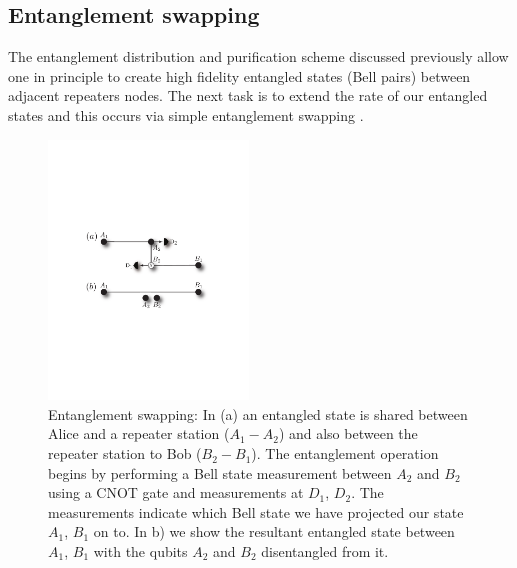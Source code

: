\documentclass[twocolumn, aps, rmp, amsmath, amssymb, nofootinbib, superscriptaddress, longbibliography, floatfix, table-of-contents, eqsecnum]{revtex4-1}
\begin{document}
\subsection{Entanglement swapping}

The entanglement distribution and purification scheme discussed previously allow one in principle to create high fidelity entangled states (Bell pairs) between adjacent repeaters nodes. The next task is to extend the rate of our entangled states and this occurs via simple entanglement swapping \cite{BDCZ98,Zukowski93,goebel08,duan01}. 

\begin{figure}[!htb]
\begin{center}
\includegraphics[width=0.475\textwidth]{repeaters_6}
\end{center}
\caption{Entanglement swapping:  In (a) an entangled state is shared between Alice and a repeater station ($A_1-A_2$) and also between the repeater station to Bob ($B_2-B_1$).  The entanglement operation begins by performing a Bell state measurement between $A_2$ and $B_2$ using a CNOT gate and measurements at $D_1$, $D_2$.  The measurements indicate which Bell state we have projected our state $A_1$, $B_1$ on to. In b) we show the resultant entangled state between $A_1$, $B_1$ with the qubits $A_2$ and $B_2$ disentangled from it.  }
\label{fig6}
\end{figure} 
\end{document}
